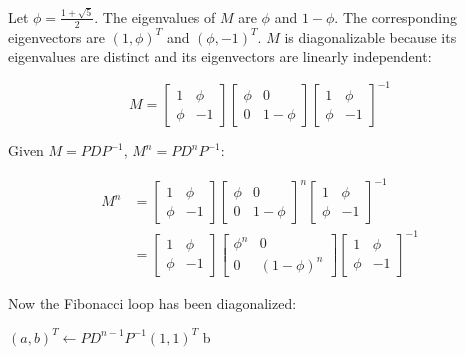 \documentclass[10pt]{article}
\begin{document}
Let $\phi = \frac{1 + \sqrt{5}}{2}$. The eigenvalues of $M$ are $\phi$ and
$1-\phi$. The corresponding eigenvectors are $(1, \phi)^T$ and $(\phi,
-1)^T$. $M$ is diagonalizable because its eigenvalues are distinct and its
eigenvectors are linearly independent:

\begin{displaymath}
M = \begin{bmatrix}
    1 & \phi \\
    \phi & -1
    \end{bmatrix}
    \begin{bmatrix}
    \phi & 0 \\
    0 & 1-\phi
    \end{bmatrix}
    \begin{bmatrix}
    1 & \phi \\
    \phi & -1
    \end{bmatrix}^{-1}
\end{displaymath}

Given $M = PDP^{-1}$, $M^n = PD^nP^{-1}$:

\begin{align*}
M^n &= \begin{bmatrix}
    1 & \phi \\
    \phi & -1
    \end{bmatrix}
    \begin{bmatrix}
    \phi & 0 \\
    0 & 1-\phi
    \end{bmatrix}^n
    \begin{bmatrix}
    1 & \phi \\
    \phi & -1
    \end{bmatrix}^{-1} \\
    &= \begin{bmatrix}
    1 & \phi \\
    \phi & -1
    \end{bmatrix}
    \begin{bmatrix}
    \phi^n & 0 \\
    0 & (1-\phi)^n
    \end{bmatrix}
    \begin{bmatrix}
    1 & \phi \\
    \phi & -1
    \end{bmatrix}^{-1}
\end{align*}

Now the Fibonacci loop has been diagonalized:

\begin{center}
    \parbox{6cm}{
        \begin{algorithmic}
                \State $(a, b)^T \gets PD^{n-1}P^{-1}(1, 1)^T$
                \State \Return b
            \EndFunction
        \end{algorithmic}
    }
\end{center}
\end{document}

